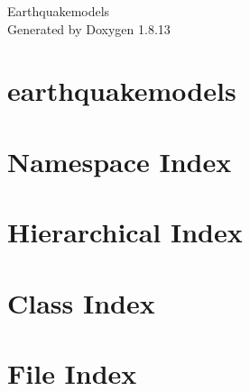 \documentclass[twoside]{book}
\newcommand{\+}{\discretionary{\mbox{\scriptsize$\hookleftarrow$}}{}{}}
\newcommand{\clearemptydoublepage}{%
  \newpage{\pagestyle{empty}\cleardoublepage}%
}
\begin{document}
\hypersetup{pageanchor=false,
             bookmarksnumbered=true,
             pdfencoding=unicode
            }
\begin{titlepage}
\vspace*{7cm}
\begin{center}%
{\Large Earthquakemodels }\\
\vspace*{1cm}
{\large Generated by Doxygen 1.8.13}\\
\end{center}
\end{titlepage}
\clearemptydoublepage
{}
\tableofcontents
\clearemptydoublepage
{}
\hypersetup{pageanchor=true}

\chapter{earthquakemodels}
\label{md__r_e_a_d_m_e}

\chapter{Namespace Index}

\chapter{Hierarchical Index}

\chapter{Class Index}

\chapter{File Index}

\end{document}

